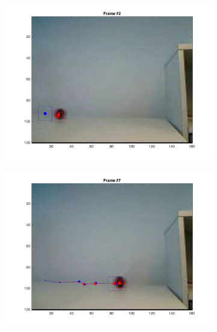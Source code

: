 \documentclass{ethz_report}
\begin{document}
\begin{figure}[h]
    \centering
    \begin{subfigure}[b]{.25\textwidth}
        \centering
        \includegraphics[width=1\linewidth]{images/video3_bins_low_1}
    \end{subfigure}%
    \begin{subfigure}[b]{.25\textwidth}
        \centering
        \includegraphics[width=1\linewidth]{images/video3_bins_low_6}
    \end{subfigure}%
    \begin{subfigure}[b]{.25\textwidth}
        \centering

\end{subfigure}
\end{figure}
\end{document}
